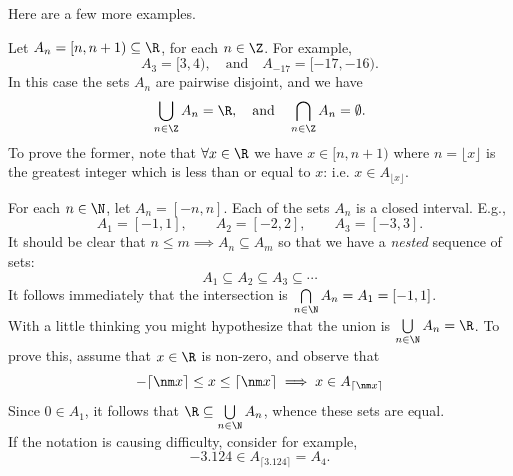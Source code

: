 Here are a few more examples.

 
\begin{examples}
	\item\label{ex:index2} Let $A_n=[n,n+1)\subseteq\R$, for each $n\in\Z$. For example,
\[A_3=[3,4),\quad\text{and}\quad A_{-17}=[-17,-16).\]
In this case the sets $A_n$ are pairwise disjoint, and we have
\[\bigcup\limits_{n\in\Z}A_n=\R,\quad\text{and}\quad\bigcap\limits_{n\in\Z}A_n=\emptyset.\]
To prove the former, note that $\forall x\in\R$ we have $x\in[n,n+1)$ where $n=\lfloor x\rfloor$ is the greatest integer which is less than or equal to $x$: i.e. $x\in A_{\lfloor x\rfloor}$.


	\item\vspace*{5pt} For each $n\in\N$, let $A_n=[-n,n]$. Each of the sets $A_n$ is a closed interval. E.g.,
	\[A_1=[-1,1],\qquad A_2=[-2,2],\qquad A_3=[-3,3].\]
	It should be clear that $n\le m\implies A_n\subseteq A_m$ so that we have a \emph{nested} sequence of sets:
	\[A_1\subseteq A_2\subseteq A_3\subseteq\cdots\]
	It follows immediately that the intersection is $\bigcap\limits_{n\in\N}A_n=A_1=[-1,1]$.\\
	With a little thinking you might hypothesize that the union is $\bigcup\limits_{n\in\N}A_n=\R$. To prove this, assume that $x\in\R$ is non-zero, and observe that
	\[-\lceil\nm x\rceil\le x\le\lceil\nm x\rceil\implies x\in A_{\lceil\nm x\rceil}\]
	Since $0\in A_1$, it follows that $\R\subseteq\bigcup\limits_{n\in\N}A_n$, whence these sets are equal.\\
	If the notation is causing difficulty, consider for example,
	\[-3.124\in A_{\lceil 3.124\rceil}=A_4.\]
	

\end{examples}
